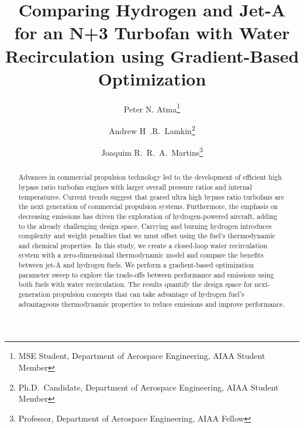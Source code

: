 \documentclass[conf]{new-aiaa}
\title{Comparing Hydrogen and Jet-A for an N+3 Turbofan with Water Recirculation using Gradient-Based Optimization} %
\author{Peter N. Atma\footnote{MSE Student, Department of Aerospace Engineering, AIAA Student Member}}
\author{Andrew H~.R.~Lamkin\footnote{Ph.D.~Candidate, Department of Aerospace Engineering, AIAA Student Member}}
\author{Joaquim R.~R.~A.~Martins\footnote{Professor, Department of Aerospace Engineering, AIAA Fellow}}
\affil{University of Michigan, Ann Arbor, MI, 48109}
\begin{document}
\maketitle

\begin{abstract}
    Advances in commercial propulsion technology led to the development of efficient high bypass ratio turbofan engines with larger overall pressure ratios and internal temperatures.
    Current trends suggest that geared ultra high bypass ratio turbofans are the next generation of commercial propulsion systems.
    Furthermore, the emphasis on decreasing emissions has driven the exploration of hydrogen-powered aircraft, adding to the already challenging design space.
    Carrying and burning hydrogen introduces complexity and weight penalties that we must offset using the fuel's thermodynamic and chemical properties.
    In this study, we create a closed-loop water recirculation system with a zero-dimensional thermodynamic model and compare the benefits between jet-A and hydrogen fuels.
    We perform a gradient-based optimization parameter sweep to explore the trade-offs between performance and emissions using both fuels with water recirculation.
    The results quantify the design space for next-generation propulsion concepts that can take advantage of hydrogen fuel's advantageous thermodynamic properties to reduce emissions and improve performance.
\end{abstract}
\end{document}
